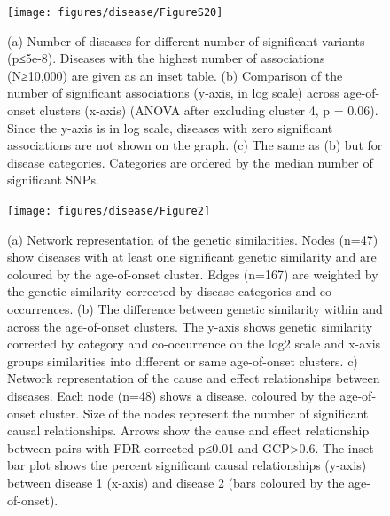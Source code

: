 \documentclass[12pt,twoside]{unicam}
\begin{document}
\begin{figure}

{\centering \texttt{[image: figures/disease/FigureS20]} 

}

\caption[Distribution of significant disease associations across diseases, age-of-onset clusters, and disease categories.]{(a) Number of diseases for different number of significant variants (p≤5e-8). Diseases with the highest number of associations (N≥10,000) are given as an inset table. (b) Comparison of the number of significant associations (y-axis, in log scale) across age-of-onset clusters (x-axis) (ANOVA after excluding cluster 4, p = 0.06). Since the y-axis is in log scale, diseases with zero significant associations are not shown on the graph. (c) The same as (b) but for disease categories. Categories are ordered by the median number of significant SNPs.}\label{fig:disFigS20}
\end{figure}

\begin{figure}

{\centering \texttt{[image: figures/disease/Figure2]} 

}

\caption[Genetic similarities and cause-effect relationships between diseases.]{(a) Network representation of the genetic similarities. Nodes (n=47) show diseases with at least one significant genetic similarity and are coloured by the age-of-onset cluster. Edges (n=167) are weighted by the genetic similarity corrected by disease categories and co-occurrences. (b) The difference between genetic similarity within and across the age-of-onset clusters. The y-axis shows genetic similarity corrected by category and co-occurrence on the log2 scale and x-axis groups similarities into different or same age-of-onset clusters. c) Network representation of the cause and effect relationships between diseases. Each node (n=48) shows a disease, coloured by the age-of-onset cluster. Size of the nodes represent the number of significant causal relationships. Arrows show the cause and effect relationship between pairs with FDR corrected p≤0.01 and GCP>0.6. The inset bar plot shows the percent significant causal relationships (y-axis) between disease 1 (x-axis) and disease 2 (bars coloured by the age-of-onset).}\label{fig:disFig2}
\end{figure}
\end{document}
